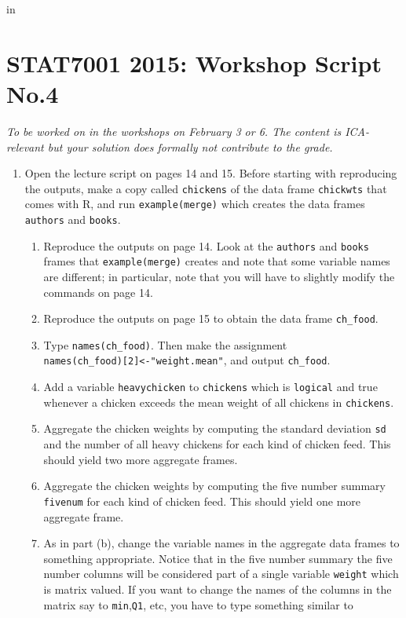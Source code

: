
\topmargin   -3cm
\textwidth   6.2in
 in



\section*{STAT7001 2015: Workshop Script No.4}
{\em To be worked on in the workshops on February 3 or 6. The content is ICA-relevant but your solution does formally not contribute to the grade.}



\begin{enumerate}


\item Open the lecture script on pages 14 and 15. Before starting with reproducing the outputs, make a copy called \texttt{chickens} of the data frame \texttt{chickwts} that comes with R, and run \texttt{example(merge)} which creates the data frames \texttt{authors} and \texttt{books}.
\begin{enumerate}
\item Reproduce the outputs on page 14. Look at the \texttt{authors} and \texttt{books} frames that \texttt{example(merge)} creates and note that some variable names are different; in particular, note that you will have to slightly modify the commands on page 14.
\item Reproduce the outputs on page 15 to obtain the data frame \texttt{ch\_food}.
\item Type \texttt{names(ch\_food)}. Then make the assignment\\
\texttt{names(ch\_food)[2]<-"weight.mean"}, and output \texttt{ch\_food}.
\item Add a variable \texttt{heavychicken} to \texttt{chickens} which is \texttt{logical} and true whenever a chicken exceeds the mean weight of all chickens in \texttt{chickens}.
\item Aggregate the chicken weights by computing the standard deviation \texttt{sd} and the number of all heavy chickens for each kind of chicken feed. This should yield two more aggregate frames.
\item Aggregate the chicken weights by computing the five number summary \texttt{fivenum} for each kind of chicken feed. This should yield one more aggregate frame.
\item As in part (b), change the variable names in the aggregate data frames to something appropriate. Notice that in the five number summary the five number columns will be considered part of a single variable \texttt{weight} which is matrix valued. If you want to change the names of the columns in the matrix say to \texttt{min},\texttt{Q1}, etc, you have to type something similar to\\

\end{enumerate}
\end{enumerate}
